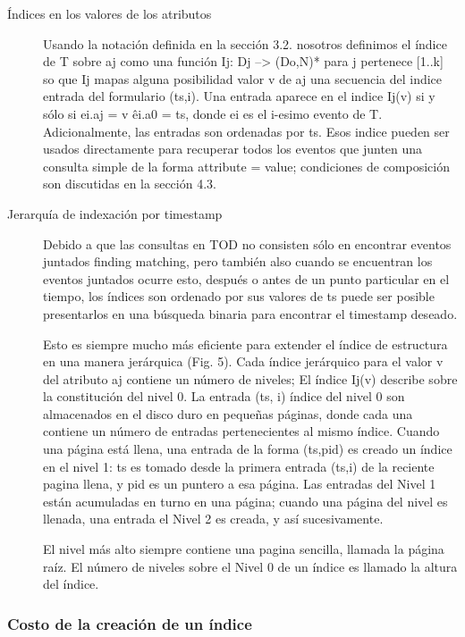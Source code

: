 \documentclass[12pt,legalpaper]{report}
\begin{document}
\begin{description}
	\item[Índices en los valores de los atributos] Usando la notación definida en la sección 3.2.  nosotros definimos el índice de T sobre aj como una función Ij: Dj --> (Do,N)* para j pertenece [1..k] so que Ij mapas alguna posibilidad valor v de aj una secuencia del indice entrada del formulario (ts,i).  Una entrada aparece en el indice Ij(v) si y sólo si ei.aj = v \^ ei.a0 = ts, donde ei es el i-esimo evento de T.  Adicionalmente, las entradas son ordenadas por ts.  Esos indice pueden ser usados directamente para recuperar todos los eventos que junten una consulta simple de la forma attribute = value; condiciones de composición son discutidas en la sección 4.3.

	\item[Jerarquía de indexación por timestamp] Debido a que las consultas en TOD no consisten sólo en encontrar eventos juntados {finding matching}, pero también {also} cuando se encuentran los eventos juntados ocurre esto, después o antes de un punto particular en el tiempo, los índices son ordenado por sus valores de ts puede ser posible presentarlos en una búsqueda binaria para encontrar el timestamp deseado.

Esto es siempre mucho más eficiente para extender el índice de estructura en una manera jerárquica (Fig. 5).  Cada índice jerárquico para el valor v del atributo aj contiene un número de niveles;  El índice Ij(v) describe sobre la constitución del nivel 0.  La entrada (ts, i) índice del nivel 0 son almacenados en el disco duro en pequeñas páginas, donde cada una contiene un número de entradas pertenecientes al mismo índice.  Cuando una página está llena, una entrada de la forma (ts,pid) es creado un índice en el nivel 1: ts es tomado desde la primera entrada (ts,i) de la reciente pagina llena, y pid es un puntero a esa página.  Las entradas del Nivel 1 están acumuladas en turno en una página; cuando una página del nivel es llenada, una entrada el Nivel 2 es creada, y así sucesivamente.  

El nivel más alto siempre contiene una pagina sencilla, llamada la página raíz.  El número de niveles sobre el Nivel 0 de un índice es llamado la altura del índice.  
\end{description}


			\subsubsection{Costo de la creación de un índice}
\end{document}
